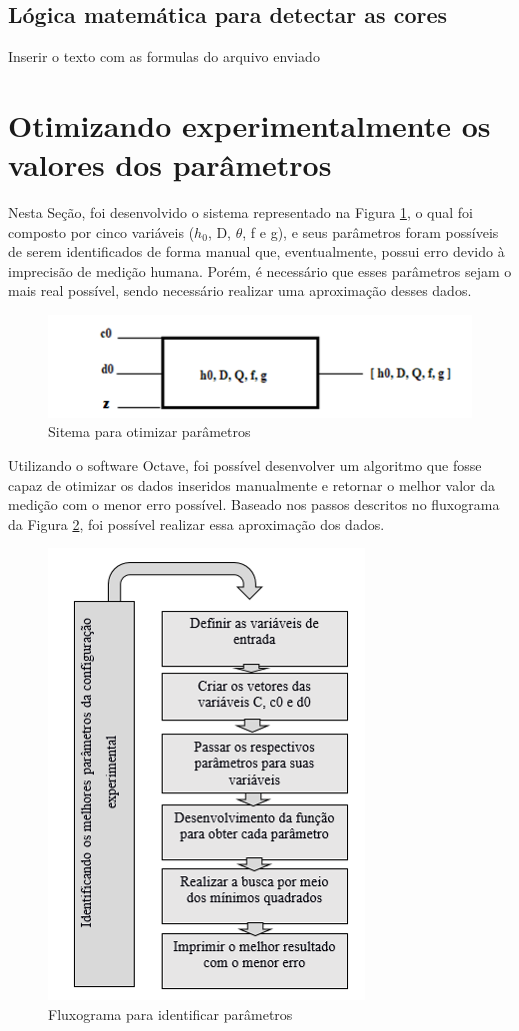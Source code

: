 \documentclass[a4paper, 12pt]{article}
\begin{document}
\subsection{Lógica matemática para detectar as cores}

Inserir o texto com as formulas do arquivo enviado


\section{Otimizando experimentalmente os valores dos parâmetros}
Nesta Seção, foi desenvolvido o sistema representado na Figura \ref{sitema_otimizacao}, o qual foi composto por cinco variáveis ($h_0$, D, $\theta$, f e g), e seus parâmetros foram possíveis de serem identificados de forma manual que, eventualmente, possui erro devido à imprecisão de medição humana. Porém, é necessário que esses parâmetros sejam o mais real possível, sendo necessário realizar uma aproximação desses dados.

\begin{figure}[h!]
	\centering
		\includegraphics[width=.55\linewidth]{sitema_otimizacao.png}
	\caption{Sitema para otimizar parâmetros}
	\label{sitema_otimizacao}
\end{figure}

Utilizando o software Octave, foi possível desenvolver um algoritmo que fosse capaz de otimizar os dados inseridos manualmente e retornar o melhor valor da medição com o menor erro possível. Baseado nos passos descritos no fluxograma da Figura \ref{identificar parametros}, foi possível realizar essa aproximação dos dados.


\begin{figure}[h!]
	\centering
		\includegraphics[width=.55\linewidth]{fluxograma_identificar_parametros.png}
	\caption{Fluxograma para identificar parâmetros}
	\label{identificar parametros}
\end{figure}
\end{document}
